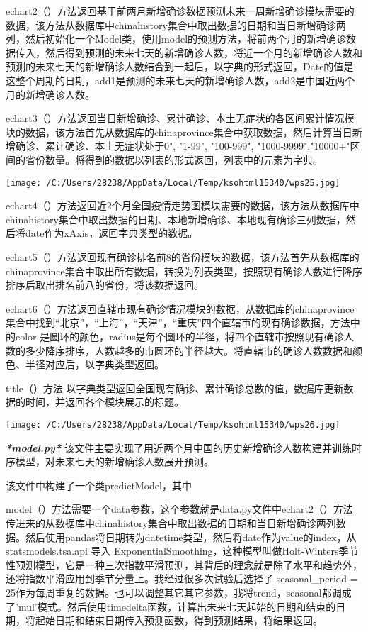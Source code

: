 \documentclass[
]{article}
\begin{document}
echart2（）方法返回基于前两月新增确诊数据预测未来一周新增确诊模块需要的数据，该方法从数据库中chinahistory集合中取出数据的日期和当日新增确诊两列，然后初始化一个Model类，使用model的预测方法，将前两个月的新增确诊数据传入，然后得到预测的未来七天的新增确诊人数，将近一个月的新增确诊人数和预测的未来七天的新增确诊人数结合到一起后，以字典的形式返回，Date的值是这整个周期的日期，add1是预测的未来七天的新增确诊人数，add2是中国近两个月的新增确诊人数。

echart3（）方法返回当日新增确诊、累计确诊、本土无症状的各区间累计情况模块的数据，该方法首先从数据库的chinaprovince集合中获取数据，然后计算当日新增确诊、累计确诊、本土无症状处于0",
"1-99", "100-999",
"1000-9999","10000+"区间的省份数量。将得到的数据以列表的形式返回，列表中的元素为字典。

\texttt{[image: /C:/Users/28238/AppData/Local/Temp/ksohtml15340/wps25.jpg]}

echart4（）方法返回近2个月全国疫情走势图模块需要的数据，该方法从数据库中chinahistory集合中取出数据的日期、本地新增确诊、本地现有确诊三列数据，然后将date作为xAxis，返回字典类型的数据。

echart5（）方法返回现有确诊排名前8的省份模块的数据，该方法首先从数据库的chinaprovince集合中取出所有数据，转换为列表类型，按照现有确诊人数进行降序排序后取出排名前八的省份，将该数据返回。

echart6（）方法返回直辖市现有确诊情况模块的数据，从数据库的chinaprovince集合中找到``北京''，``上海''，``天津''，``重庆''四个直辖市的现有确诊数据，方法中的color
是圆环的颜色，radius是每个圆环的半径，将四个直辖市按照现有确诊人数的多少降序排序，人数越多的市圆环的半径越大。将直辖市的确诊人数数据和颜色、半径对应后，以字典类型返回。

title（）方法
以字典类型返回全国现有确诊、累计确诊总数的值，数据库更新数据的时间，并返回各个模块展示的标题。

\texttt{[image: /C:/Users/28238/AppData/Local/Temp/ksohtml15340/wps26.jpg]}

\emph{\textbf{*model.py*}}
该文件主要实现了用近两个月中国的历史新增确诊人数构建并训练时序模型，对未来七天的新增确诊人数展开预测。

该文件中构建了一个类predictModel，其中

model（）方法需要一个data参数，这个参数就是data.py文件中echart2（）方法传进来的从数据库中chinahistory集合中取出数据的日期和当日新增确诊两列数据。然后使用pandas将日期转为datetime类型，然后将date作为value的index，从
statsmodels.tsa.api 导入
ExponentialSmoothing，这种模型叫做Holt-Winters季节性预测模型，它是一种三次指数平滑预测，其背后的理念就是除了水平和趋势外，还将指数平滑应用到季节分量上。我经过很多次试验后选择了
seasonal\_period =
25作为每周重复的数据。也可以调整其它其它参数，我将trend，seasonal都调成了'mul'模式。然后使用timedelta函数，计算出未来七天起始的日期和结束的日期，将起始日期和结束日期传入预测函数，得到预测结果，将结果返回。
\end{document}
